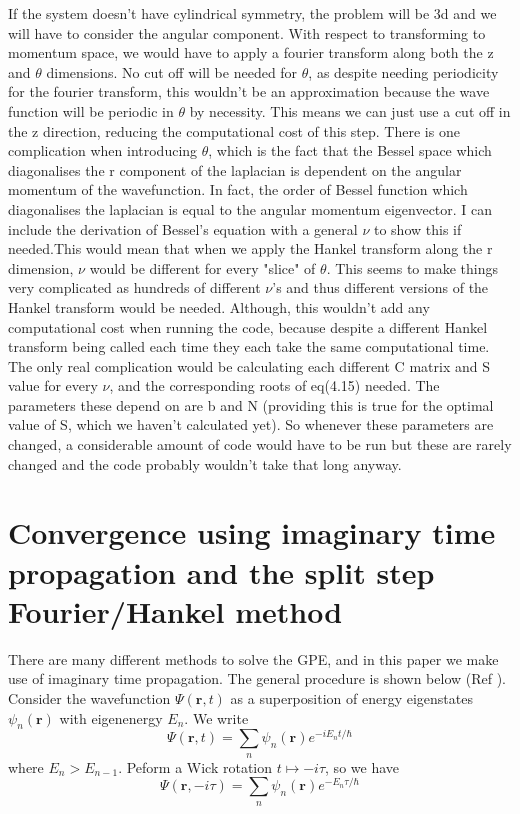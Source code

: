 \documentclass[10pt]{article}
\numberwithin{equation}{section}
\begin{document}
\begin{multicols}{2}
If the system doesn't have cylindrical symmetry, the problem will be 3d and we will have to consider the angular component. With respect to transforming to momentum space, we would have to apply a fourier transform along both the z and $\theta$ dimensions. No cut off will be needed for $\theta$, as despite needing periodicity for the fourier transform, this wouldn't be an approximation because the wave function will be periodic in $\theta$ by necessity. This means we can just use a cut off in the z direction, reducing the computational cost of this step. There is one complication when introducing $\theta$, which is the fact that the Bessel space which diagonalises the r component of the laplacian is dependent on the angular momentum of the wavefunction. In fact, the order of Bessel function which diagonalises the laplacian is equal to the angular momentum eigenvector. I can include the derivation of Bessel's equation with a general $\nu$ to show this if needed.This would mean that when we apply the Hankel transform along the r dimension, $\nu$ would be different for every "slice" of $\theta$. This seems to make things very complicated as hundreds of different $\nu$'s and thus different versions of the Hankel transform would be needed. Although, this wouldn't add any computational cost when running the code, because despite a different Hankel transform being called each time they each take the same computational time. The only real complication would be calculating each different C matrix and S value for every $\nu$, and the corresponding roots of eq(4.15) needed. The parameters these depend on are b and N (providing this is true for the optimal value of S, which we haven't calculated yet). So whenever these parameters are changed, a considerable amount of code would have to be run but these are rarely changed and the code probably wouldn't take that long anyway.


\section{Convergence using imaginary time propagation and the split step Fourier/Hankel method}
There are many different methods to solve the GPE, and in this paper we make use of imaginary time propagation. The general procedure is shown below (Ref \cite{PhysRevE.62.7438}).
Consider the wavefunction $\Psi(\textbf{r},t)$ as a superposition of energy eigenstates $\psi_{n}(\textbf{r})$ with eigenenergy $E_n$. We write
\begin{equation}
\Psi(\textbf{r},t) = \sum_n \psi_{n}(\textbf{r}) e^{-i E_n t /\hbar}
\end{equation}
where $E_n > E_{n-1}$. Peform a Wick rotation $t \mapsto -i \tau$, so we have
\begin{equation}
\Psi(\textbf{r},-i\tau) = \sum_n \psi_{n}(\textbf{r}) e^{-E_n \tau /\hbar}
\end{equation}


\end{multicols}
\end{document}
